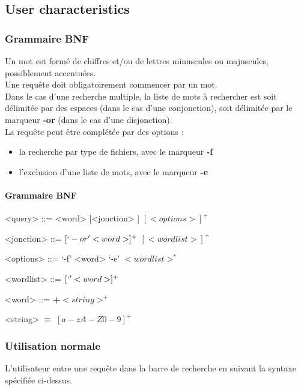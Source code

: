 \documentclass[a4paper,10pt]{article}
\begin{document}
\subsection{User characteristics}


\subsubsection{Grammaire BNF}
\setlength{\grammarparsep}{20pt plus 1pt minus 1pt} %
\setlength{\grammarindent}{12em} %

Un mot est formé de chiffres et/ou de lettres minuscules ou majuscules, possiblement accentuées.\\
Une requête doit obligatoirement commencer par un mot.\\
Dans le cas d'une recherche multiple, la liste de mots à rechercher est soit délimitée par 
des espaces (dans le cas d'une conjonction), soit délimitée par le marqueur \textbf{-or} (dans le
cas d'une disjonction).\\
La requête peut être complétée par des options :
\begin{itemize}
 \item la recherche par type de fichiers, avec le marqueur \textbf{-f}
 \item l'exclusion d'une liste de mots, avec le marqueur \textbf{-e}
 \end{itemize}

\paragraph{Grammaire BNF}
\begin{grammar}
<query> ::= <word> [<jonction> ] $[ <options> ]^+$

<jonction> ::= $[ `-or' <word> ]^+$
\alt $[ <wordlist> ]^+$

<options> ::= `-f' <word>
\alt `-e' $<wordlist>^*$

<wordlist> ::= $[ ` ' <word> ]^+$

<word> ::= \textbf{+}$<string>^+$

<string> $\equiv$ $[ a-z A-Z 0-9 ]^+$
\end{grammar}
 
\subsubsection{Utilisation normale}
L'utilisateur entre une requête dans la barre de recherche en suivant la syntaxe 
spécifiée ci-dessus.
\end{document}
